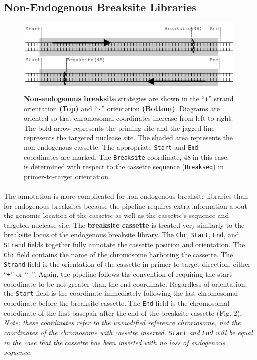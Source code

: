 \documentclass{article}
\begin{document}
\subsection{Non-Endogenous Breaksite Libraries}
\begin{figure}[H]
\centering
  \includegraphics[width=\textwidth]{nonendogenous_breaksite}
\caption{\textbf{Non-endogenous breaksite} strategies are shown in the ``\texttt{+}'' strand orientation \textbf{(Top)} and ``\texttt{-}'' orientation \textbf{(Bottom)}. Diagrams are oriented so that chromosomal coordinates increase from left to right. The bold arrow represents the priming site and the jagged line represents the targeted nuclease site. The shaded area represents the non-endogenous cassette. The appropriate \texttt{Start} and \texttt{End} coordinates are marked. The \texttt{Breaksite} coordinate, 48 in this case, is determined with respect to the cassette sequence (\texttt{Breakseq}) in primer-to-target orientation.}
\label{overflow}
\end{figure}
\paragraph{} The annotation is more complicated for non-endogenous breaksite libraries than for endogenous breaksites because the pipeline requires extra information about the genomic location of the cassette as well as the cassette's sequence and targeted nuclease site. The \textbf{breaksite cassette} is treated very similarly to the breaksite locus of the endogenous breaksite library. The \texttt{Chr}, \texttt{Start}, \texttt{End}, and \texttt{Strand} fields together fully annotate the cassette position and orientation. The \texttt{Chr} field contains the name of the chromosome harboring the cassette. The \texttt{Strand} field is the orientation of the cassette in primer-to-target direction, either ``\texttt{+}'' or ``\texttt{-}''. Again, the pipeline follows the convention of requiring the start coordinate to be not greater than the end coordinate. Regardless of orientation, the \texttt{Start} field is the coordinate immediately following the last chromosomal coordinate before the breaksite cassette. The \texttt{End} field is the chromosomal coordinate of the first basepair after the end of the breaksite cassette (Fig. 2). \emph{Note: these coordinates refer to the unmodified reference chromosome, not the coordinates of the chromosome with cassette inserted. \texttt{Start} and \texttt{End} will be equal in the case that the cassette has been inserted with no loss of endogenous sequence.}
\end{document}
